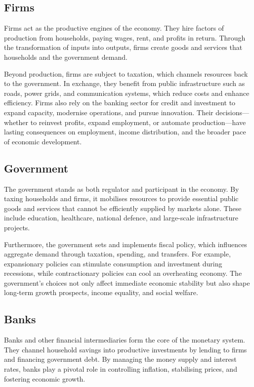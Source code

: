 \documentclass[10pt,onecolumn]{witseiepaper}
\begin{document}
\subsection{Firms}
Firms act as the productive engines of the economy. They hire factors of production from households, paying wages, rent, and profits in return. Through the transformation of inputs into outputs, firms create goods and services that households and the government demand.  

Beyond production, firms are subject to taxation, which channels resources back to the government. In exchange, they benefit from public infrastructure such as roads, power grids, and communication systems, which reduce costs and enhance efficiency. Firms also rely on the banking sector for credit and investment to expand capacity, modernise operations, and pursue innovation. Their decisions—whether to reinvest profits, expand employment, or automate production—have lasting consequences on employment, income distribution, and the broader pace of economic development.

\subsection{Government}
The government stands as both regulator and participant in the economy. By taxing households and firms, it mobilises resources to provide essential public goods and services that cannot be efficiently supplied by markets alone. These include education, healthcare, national defence, and large-scale infrastructure projects.  

Furthermore, the government sets and implements fiscal policy, which influences aggregate demand through taxation, spending, and transfers. For example, expansionary policies can stimulate consumption and investment during recessions, while contractionary policies can cool an overheating economy. The government’s choices not only affect immediate economic stability but also shape long-term growth prospects, income equality, and social welfare.

\subsection{Banks}
Banks and other financial intermediaries form the core of the monetary system. They channel household savings into productive investments by lending to firms and financing government debt. By managing the money supply and interest rates, banks play a pivotal role in controlling inflation, stabilising prices, and fostering economic growth.  
\end{document}

